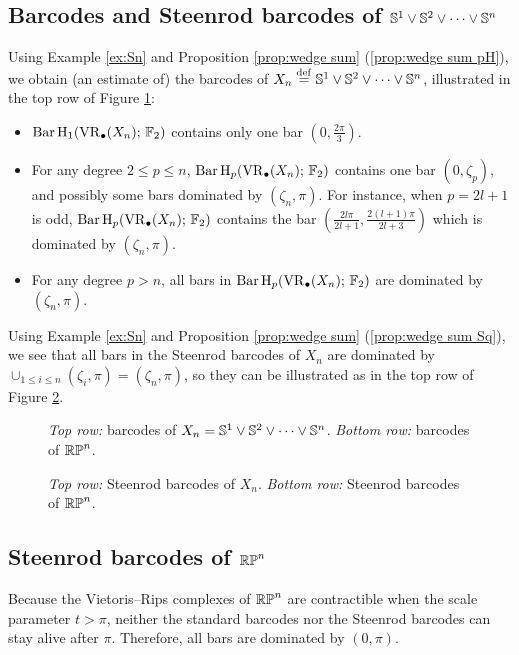 \subsection{Barcodes and Steenrod barcodes of $\mathbb{S}^1 \vee \mathbb{S}^2 \vee \dots \vee \mathbb{S}^n$}

Using Example \ref{ex:Sn} and Proposition \ref{prop:wedge sum} (\ref{prop:wedge sum pH}), we obtain (an estimate of) the barcodes of $X_n\stackrel{\mathrm{def}}{=} \mathbb{S}^1\vee\mathbb{S}^2\vee\dots\vee\mathbb{S}^n$, illustrated in the top row of Figure \ref{fig:barcodes}:
\begin{itemize}
	\item $\operatorname{Bar} \operatorname{H}_{1}(\operatorname{VR}_\bullet(X_n);\,{\mathbb{F}_2})$ contains only one bar $\left(0,\frac{2\pi}{3}\right)$.
	\item For any degree $2\leq p\leq n$, $\operatorname{Bar} \operatorname{H}_{p}(\operatorname{VR}_\bullet(X_n);\,{\mathbb{F}_2})$ contains one bar $(0,\zeta_p)$, and possibly some bars dominated by $(\zeta_n,\pi)$. For instance, when $p=2l+1$ is odd, $\operatorname{Bar} \operatorname{H}_{p}(\operatorname{VR}_\bullet(X_n);\,{\mathbb{F}_2})$ contains the bar $( \frac{2l\pi}{2l+1},\frac{2(l+1)\pi}{2l+3})$ which is dominated by $(\zeta_n,\pi)$.
	\item For any degree $p>n$, all bars in $\operatorname{Bar} \operatorname{H}_{p}(\operatorname{VR}_\bullet(X_n);\,{\mathbb{F}_2})$ are dominated by $(\zeta_n,\pi)$.
\end{itemize}

Using Example \ref{ex:Sn} and Proposition \ref{prop:wedge sum} (\ref{prop:wedge sum Sq}), we see that all bars in the Steenrod barcodes of $X_n$ are dominated by $\cup_{1\leq i\leq n}(\zeta_i,\pi)=(\zeta_n,\pi)$, so they can be illustrated as in the top row of Figure \ref{fig:sq barcodes}.

\begin{figure}
	\centering
	
	\caption{\emph{Top row:} barcodes of $X_n = \mathbb{S}^1\vee\mathbb{S}^2\vee\dots\vee\mathbb{S}^n$. \emph{Bottom row:} barcodes of $\mathbb{RP}^n$. }
	\label{fig:barcodes}
\end{figure}

\begin{figure}
	\centering
	
	\caption{\emph{Top row:} Steenrod barcodes of $X_n$. \emph{Bottom row:} Steenrod barcodes of $\mathbb{RP}^n$. }
	\label{fig:sq barcodes}
\end{figure}

\subsection{Steenrod barcodes of $\mathbb{RP}^n$}

Because the Vietoris--Rips complexes of $\mathbb{RP}^n$ are contractible when the scale parameter $t>\pi$, neither the standard barcodes nor the Steenrod barcodes can stay alive after $\pi$. Therefore, all bars are dominated by $(0,\pi)$.

